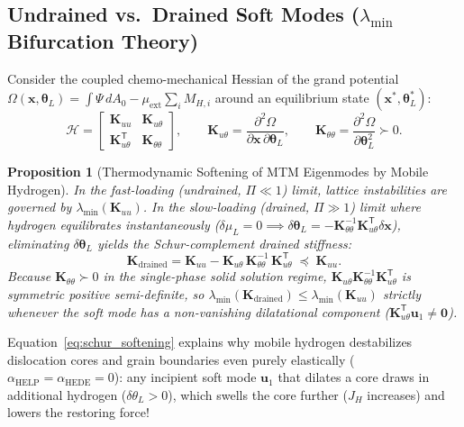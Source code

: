 \documentclass[11pt,a4paper]{article}
\newcommand{\T}{^{\mathsf T}}
\newtheorem{proposition}{Proposition}
\begin{document}
\subsection{Undrained vs.\ Drained Soft Modes (\texorpdfstring{$\lambda_{\min}$}{lambda\_min} Bifurcation Theory)}

Consider the coupled chemo-mechanical Hessian of the grand potential $\Omega(\mathbf{x}, \boldsymbol{\theta}_L) = \int \Psi\,dA_0 - \mu_{\text{ext}}\sum_i M_{H,i}$ around an equilibrium state $(\mathbf{x}^*, \boldsymbol{\theta}_L^*)$:
\begin{equation}
  \mathcal{H} =
  \begin{bmatrix}
    \mathbf{K}_{uu} & \mathbf{K}_{u\theta} \\[4pt]
    \mathbf{K}_{u\theta}\T & \mathbf{K}_{\theta\theta}
  \end{bmatrix},
  \qquad
  \mathbf{K}_{u\theta} = \frac{\partial^2 \Omega}{\partial \mathbf{x}\,\partial \boldsymbol{\theta}_L},
  \qquad
  \mathbf{K}_{\theta\theta} = \frac{\partial^2 \Omega}{\partial \boldsymbol{\theta}_L^2} \succ 0.
  \label{eq:coupled_hessian}
\end{equation}
\begin{proposition}[Thermodynamic Softening of MTM Eigenmodes by Mobile Hydrogen]
In the fast-loading (undrained, $\Pi \ll 1$) limit, lattice instabilities are governed by $\lambda_{\min}(\mathbf{K}_{uu})$. In the slow-loading (drained, $\Pi \gg 1$) limit where hydrogen equilibrates instantaneously ($\delta \mu_L = 0 \implies \delta \boldsymbol{\theta}_L = -\mathbf{K}_{\theta\theta}^{-1}\mathbf{K}_{u\theta}\T \delta\mathbf{x}$), eliminating $\delta\boldsymbol{\theta}_L$ yields the Schur-complement \emph{drained stiffness}:
\begin{equation}
  \boxed{
  \mathbf{K}_{\mathrm{drained}} = \mathbf{K}_{uu} - \mathbf{K}_{u\theta}\,\mathbf{K}_{\theta\theta}^{-1}\,\mathbf{K}_{u\theta}\T \;\preceq\; \mathbf{K}_{uu}.
  }
  \label{eq:schur_softening}
\end{equation}
Because $\mathbf{K}_{\theta\theta} \succ 0$ in the single-phase solid solution regime, $\mathbf{K}_{u\theta}\mathbf{K}_{\theta\theta}^{-1}\mathbf{K}_{u\theta}\T$ is symmetric positive semi-definite, so $\lambda_{\min}(\mathbf{K}_{\mathrm{drained}}) \le \lambda_{\min}(\mathbf{K}_{uu})$ \emph{strictly whenever the soft mode has a non-vanishing dilatational component ($\mathbf{K}_{u\theta}\T \mathbf{u}_1 \neq \mathbf{0}$)}.
\end{proposition}
Equation~\eqref{eq:schur_softening} explains why mobile hydrogen destabilizes dislocation cores and grain boundaries even purely elastically ($\alpha_{\text{HELP}}=\alpha_{\text{HEDE}}=0$): any incipient soft mode $\mathbf{u}_1$ that dilates a core draws in additional hydrogen ($\delta\theta_L > 0$), which swells the core further ($J_H$ increases) and lowers the restoring force!
\end{document}

